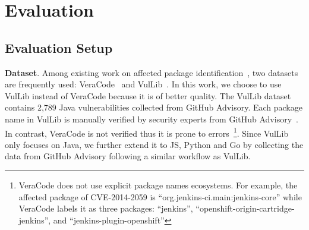\section{Evaluation}
\label{sec:evalution}

\subsection{Evaluation Setup}

\noindent \textbf{Dataset}. Among existing work on affected package identification~\cite{fastxml,lightxml,chronos,vullibminer}, two datasets are frequently used: VeraCode~\cite{fastxml} and VulLib~\cite{vullibminer}. In this work, we choose to use VulLib instead of VeraCode because it is of better quality. The VulLib dataset contains 2,789 Java vulnerabilities collected from GitHub Advisory. Each package name in VulLib is manually verified by security experts from GitHub Advisory~\cite{githubAD}. In contrast, VeraCode is not verified thus it is prone to errors~\footnote{VeraCode does not use explicit package names ecosystems. For example, the affected package of CVE-2014-2059 is ``org.jenkins-ci.main:jenkins-core'' while VeraCode labels it as three packages: ``jenkins'', ``openshift-origin-cartridge-jenkins'', and ``jenkins-plugin-openshift''}.
Since VulLib only focuses on Java, we further extend it to JS, Python and Go by collecting the data from GitHub Advisory following a similar workflow as VulLib. 





